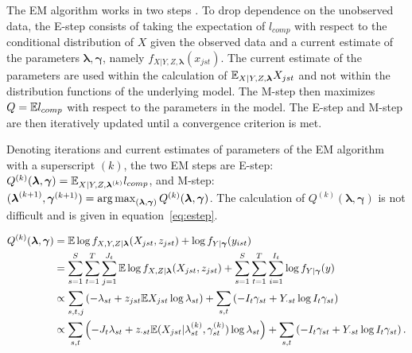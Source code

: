 
The EM algorithm works in two steps \citep{Dempster:1977,McLachlan:2007}.  To drop dependence on the unobserved data, the E-step consists of taking the expectation of $l_{comp}$ with respect to the conditional distribution of $X$ given the observed data and a current estimate of the parameters $\boldsymbol{\lambda}, \boldsymbol{\gamma}$, namely $f_{X|Y,Z,\boldsymbol{\lambda}}(x_{jst})$.  The current estimate of the parameters are used within the calculation of $\mathbb{E}_{X|Y,Z,\boldsymbol{\lambda}}X_{jst}$ and not within the distribution functions of the underlying model.  The M-step then maximizes $Q = \mathbb{E} l_{comp}$ with respect to the parameters in the model.  The E-step and M-step are then iteratively updated until a convergence criterion is met.  

Denoting iterations and current estimates of parameters of the EM algorithm with a superscript $(k)$, the two EM steps are E-step: $Q^{(k)}(\boldsymbol{\lambda}, \boldsymbol{\gamma}) = \mathbb{E}_{X|Y,Z,\boldsymbol{\lambda}^{(k)}} l_{comp}$, and M-step: $(\boldsymbol{\lambda}^{(k+1)}, \boldsymbol{\gamma}^{(k+1)}) = \operatorname*{arg\,max}_{(\boldsymbol{\lambda}, \boldsymbol{\gamma})} Q^{(k)}(\boldsymbol{\lambda}, \boldsymbol{\gamma})$.  The calculation of $Q^{(k)}(\boldsymbol{\lambda}, \boldsymbol{\gamma})$ is not difficult and is given in equation~\ref{eq:estep}.

\begin{align}
  \label{eq:estep}
  \begin{split}
  Q^{(k)}(\boldsymbol{\lambda}, \boldsymbol{\gamma})
  & = \mathbb{E} \log{f_{X,Y,Z|\boldsymbol{\lambda}}(X_{jst},z_{jst})} + \log{f_{Y|\boldsymbol{\gamma}}(y_{ist})} \\
  & = \sum_{s=1}^S \sum_{t=1}^T \sum_{j=1}^{J_t} \mathbb{E} \log{f_{X,Z|\boldsymbol{\lambda}}(X_{jst},z_{jst})}
  + \sum_{s=1}^S \sum_{t=1}^T \sum_{i=1}^{I_t} \log{f_{Y|\boldsymbol{\gamma}}(y)} \\
  & \propto \sum_{s,t,j} \left( - \lambda_{st} 
    + z_{jst} \mathbb{E} X_{jst} \log{\lambda_{st}}  \right) + \sum_{s,t} \left( -I_t \gamma_{st} + Y_{\cdot st} \log{I_t \gamma_{st}} \right) \\
  & \propto \sum_{s,t} \left( -J_t \lambda_{st} + z_{\cdot st} \mathbb{E} (X_{jst}|\lambda_{st}^{(k)},\gamma_{st}^{(k)}) \log{\lambda_{st}} \right) + \sum_{s,t} \left( -I_t \gamma_{st} + Y_{\cdot st} \log{I_t \gamma_{st}} \right).
\end{split}
\end{align}

